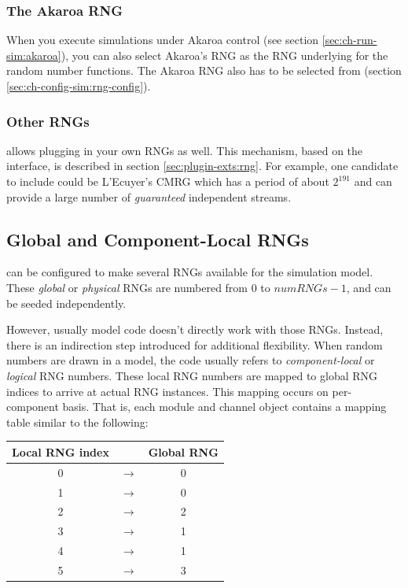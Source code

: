 \subsubsection{The Akaroa RNG}

When you execute simulations under Akaroa control (see section
\ref{sec:ch-run-sim:akaroa}), you can also select Akaroa's
RNG as the RNG underlying for the {\opp} random number functions.
The Akaroa RNG also has to be selected from 
(section \ref{sec:ch-config-sim:rng-config}).

\subsubsection{Other RNGs}

{\opp} allows plugging in your own RNGs as well. This mechanism,
based on the  interface, is described in section
\ref{sec:plugin-exts:rng}.
For example, one candidate to include could be L'Ecuyer's CMRG \cite{LEcuyer02}
which has a period of about $2^{191}$ and can provide a large
number of \textit{guaranteed} independent streams.


\subsection{Global and Component-Local RNGs}

{\opp} can be configured to make several RNGs available for the simulation
model. These \textit{global} or \textit{physical} RNGs are numbered from
$0$ to $numRNGs-1$, and can be seeded independently.

However, usually model code doesn't directly work with those RNGs. Instead,
there is an indirection step introduced for additional flexibility. When
random numbers are drawn in a model, the code usually refers to
\textit{component-local} or \textit{logical} RNG numbers. These
local RNG numbers are mapped to global RNG indices to arrive at
actual RNG instances. This mapping occurs on per-component basis. That is,
each module and channel object contains a mapping table similar to the
following:

\begin{tabular}{ c c c }
Local RNG index &               & Global RNG \\ \hline
              0 & $\rightarrow$ & 0 \\
              1 & $\rightarrow$ & 0 \\
              2 & $\rightarrow$ & 2 \\
              3 & $\rightarrow$ & 1 \\
              4 & $\rightarrow$ & 1 \\
              5 & $\rightarrow$ & 3 \\
\end{tabular}

